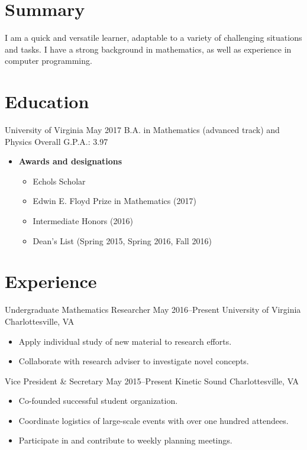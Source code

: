 \documentclass[12pt]{article}
\begin{document}


\section*{Summary}
I am a quick and versatile learner, adaptable to a variety of challenging situations and tasks.
I have a strong background in mathematics, as well as experience in computer programming.

\section*{Education}
\entry
    {University of Virginia}
    {May 2017}
    {B.A. in Mathematics (advanced track) and Physics}
    {Overall G.P.A.: 3.97}
\begin{itemize}
    \item \textbf{Awards and designations}
        \begin{itemize}
            \item Echols Scholar
            \item Edwin E. Floyd Prize in Mathematics (2017)
            \item Intermediate Honors (2016)
            \item Dean's List (Spring 2015, Spring 2016, Fall 2016)
        \end{itemize}
\end{itemize}

\section*{Experience}
\entry
    {Undergraduate Mathematics Researcher}
    {May 2016--Present}
    {University of Virginia}
    {Charlottesville, VA}
\begin{itemize}
    \item Apply individual study of new material to research efforts.
    \item Collaborate with research adviser to investigate novel concepts.
\end{itemize}

\entry
    {Vice President \& Secretary}
    {May 2015--Present}
    {Kinetic Sound}
    {Charlottesville, VA}
\begin{itemize}
    \item Co-founded successful student organization.
    \item Coordinate logistics of large-scale events with over one hundred attendees.
    \item Participate in and contribute to weekly planning meetings.
\end{itemize}
\end{document}
